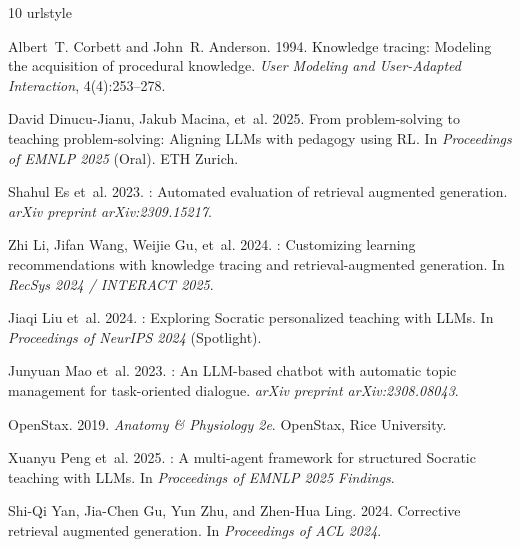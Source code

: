 \documentclass[11pt]{article}
\begin{document}
\begin{thebibliography}{10}
\providecommand{\natexlab}[1]{#1}
\expandafter\ifx\csname urlstyle\endcsname\relax
  \providecommand{\doi}[1]{doi:\discretionary{}{}{}#1}\else
  \providecommand{\doi}{doi:\discretionary{}{}{}\begingroup
  \urlstyle{rm}\Url}\fi

Albert~T. Corbett and John~R. Anderson. 1994.
\newblock Knowledge tracing: Modeling the acquisition of procedural knowledge.
\newblock \emph{User Modeling and User-Adapted Interaction}, 4(4):253--278.

David Dinucu-Jianu, Jakub Macina, et~al. 2025.
\newblock From problem-solving to teaching problem-solving: Aligning {LLMs}
  with pedagogy using {RL}.
\newblock In \emph{Proceedings of EMNLP 2025} (Oral). ETH Zurich.

Shahul Es et~al. 2023.
: Automated evaluation of retrieval augmented generation.
\newblock \emph{arXiv preprint arXiv:2309.15217}.

Zhi Li, Jifan Wang, Weijie Gu, et~al. 2024.
: Customizing learning recommendations with knowledge
  tracing and retrieval-augmented generation.
\newblock In \emph{RecSys 2024 / INTERACT 2025}.

Jiaqi Liu et~al. 2024.
: Exploring Socratic personalized teaching with {LLMs}.
\newblock In \emph{Proceedings of NeurIPS 2024} (Spotlight).

Junyuan Mao et~al. 2023.
: An {LLM}-based chatbot with automatic topic management
  for task-oriented dialogue.
\newblock \emph{arXiv preprint arXiv:2308.08043}.

{OpenStax}. 2019.
\newblock \emph{Anatomy \& Physiology 2e}.
\newblock OpenStax, Rice University.

Xuanyu Peng et~al. 2025.
: A multi-agent framework for structured Socratic teaching with
  {LLMs}.
\newblock In \emph{Proceedings of EMNLP 2025 Findings}.

Shi-Qi Yan, Jia-Chen Gu, Yun Zhu, and Zhen-Hua Ling. 2024.
\newblock Corrective retrieval augmented generation.
\newblock In \emph{Proceedings of ACL 2024}.

\end{thebibliography}
\end{document}

